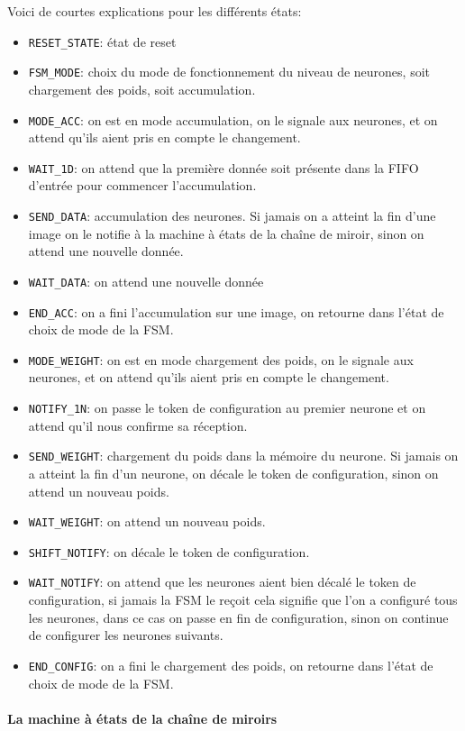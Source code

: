Voici de courtes explications pour les différents états:
\begin{itemize}
	\item \verb+RESET_STATE+: état de reset
	\item \verb+FSM_MODE+: choix du mode de fonctionnement du niveau de
		neurones, soit chargement des poids, soit accumulation.
	\item \verb+MODE_ACC+: on est en mode accumulation, on le signale aux
		neurones, et on attend qu'ils aient pris en compte le changement.
	\item \verb+WAIT_1D+: on attend que la première donnée soit présente
		dans la FIFO d'entrée pour commencer l'accumulation.
	\item \verb+SEND_DATA+: accumulation des neurones. Si jamais on a atteint
		la fin d'une image on le notifie à la machine à états de la
		chaîne de miroir, sinon on attend une nouvelle donnée.
	\item \verb+WAIT_DATA+: on attend une nouvelle donnée
	\item \verb+END_ACC+: on a fini l'accumulation sur une image, on retourne
		dans l'état de choix de mode de la FSM.
	\item \verb+MODE_WEIGHT+: on est en mode chargement des poids, on le signale aux
		neurones, et on attend qu'ils aient pris en compte le changement.
	\item \verb+NOTIFY_1N+: on passe le token de configuration au premier neurone
		et on attend qu'il nous confirme sa réception.
	\item \verb+SEND_WEIGHT+: chargement du poids dans la mémoire du neurone.
		Si jamais on a atteint la fin d'un neurone, on décale le token
		de configuration, sinon on attend un nouveau poids.
	\item \verb+WAIT_WEIGHT+: on attend un nouveau poids.
	\item \verb+SHIFT_NOTIFY+: on décale le token de configuration.
	\item \verb+WAIT_NOTIFY+: on attend que les neurones aient bien décalé
		le token de configuration, si jamais la FSM le reçoit cela signifie
		que l'on a configuré tous les neurones, dans ce cas on passe en
		fin de configuration, sinon on continue de configurer les neurones suivants.
	\item \verb+END_CONFIG+: on a fini le chargement des poids, on retourne
		dans l'état de choix de mode de la FSM.
\end{itemize}


\paragraph{La machine à états de la chaîne de miroirs}

